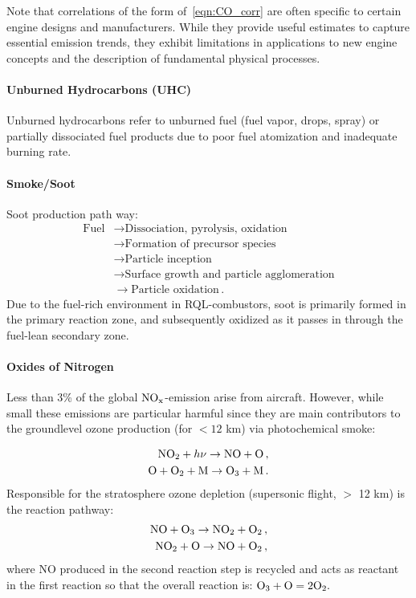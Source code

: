 Note that correlations of the form of~\cref{eqn:CO_corr} are often specific to certain engine designs and manufacturers. While they provide useful estimates to capture essential emission trends, they exhibit limitations in applications to new engine concepts and the description of fundamental physical processes.

\paragraph*{\bf Unburned Hydrocarbons (UHC)}
Unburned hydrocarbons refer to unburned fuel (fuel vapor, drops, spray) or partially dissociated fuel products due to poor fuel atomization and inadequate burning rate.

\paragraph*{\bf Smoke/Soot}
Soot production path way:
\begin{equation*}
\begin{split}
  \text{Fuel} &\rightarrow \text{Dissociation, pyrolysis, oxidation} \\ 
  &\rightarrow \text{Formation of precursor species} \\
  &\rightarrow \text{Particle inception}\\
  &\rightarrow \text{Surface growth and particle agglomeration}\\
  & \rightarrow \text{Particle oxidation}\,.
\end{split}
\end{equation*}
Due to the fuel-rich environment in RQL-combustors, soot is primarily formed in the primary reaction zone, and subsequently oxidized as it passes in through the fuel-lean secondary zone.

\paragraph*{\bf Oxides of Nitrogen}
Less than 3\% of the global $\mathrm{NO_x}$-emission arise from aircraft. However, while small these emissions are particular harmful since they are main contributors to the groundlevel ozone production (for $<12$ km) via photochemical smoke:

\[
  \begin{split}
  \mathrm{NO_2} + h\nu \rightarrow \mathrm{NO} + \mathrm{O} \, ,\\
  \mathrm{O} + \mathrm{O_2} + \mathrm{M} \rightarrow \mathrm{O_3} + \mathrm{M} \, .
  \end{split}
\]
Responsible for the stratosphere ozone depletion (supersonic flight, $>$ 12 km) is the reaction pathway:
\[
  \begin{split}
  \mathrm{NO} + \mathrm{O_3} \rightarrow \mathrm{NO_2} + \mathrm{O_2} \, ,\\
  \mathrm{NO_2} + \mathrm{O} \rightarrow \mathrm{NO} + \mathrm{O_2} \,,
  \end{split}
\]
where NO produced in the second reaction step is recycled and acts as reactant in the first reaction so that the overall reaction is: $\mathrm{O_3}+\mathrm{O}= 2\mathrm{O_2}.$

